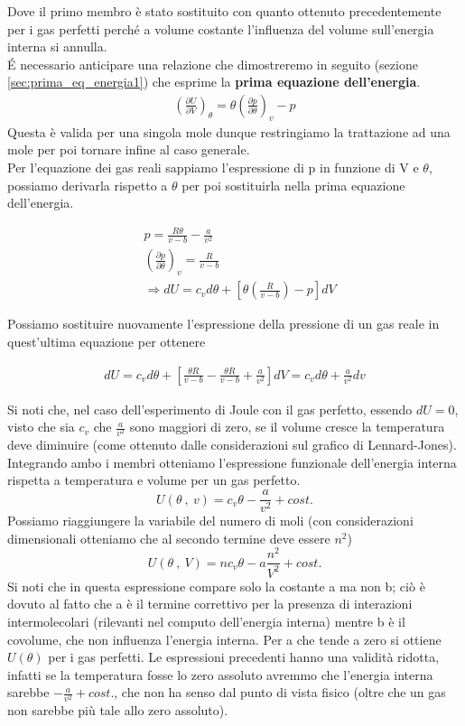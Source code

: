 \documentclass[
10pt, %
a4paper, %
oneside, %
headinclude,footinclude, %
BCOR5mm, %
]{scrartcl}
\begin{document}
Dove il primo membro è stato sostituito con quanto ottenuto precedentemente per i gas perfetti perché a volume costante l'influenza del volume sull'energia interna si annulla.\\
\'{E} necessario anticipare una relazione che dimostreremo in seguito (sezione \ref{sec:prima_eq_energia1}) che esprime la \textbf{prima equazione dell'energia}.
\begin{align}\label{eq:prima_eq_energia}
	\left(\frac{\partial U}{\partial V}\right)_{\theta} = \theta \left(\frac{\partial p}{\partial \theta}\right)_v - p 
\end{align}
Questa è valida per una singola mole dunque restringiamo la trattazione ad una mole per poi tornare infine al caso generale.\\
Per l'equazione dei gas reali sappiamo l'espressione di p in funzione di V e \(\theta\), possiamo derivarla rispetto a $\theta$ per poi sostituirla nella prima equazione dell'energia. 

\begin{align*} 
	&p = \frac{R\theta}{v-b}-\frac{a}{v^2}\\
	&\left(\frac{\partial p}{\partial \theta}\right)_v = \frac{R}{v-b}\\
	&\Rightarrow dU = c_v d\theta + \left[ \theta \left(\frac{R}{v-b}\right)-p \right]dV
\end{align*} 

Possiamo sostituire nuovamente l'espressione della pressione di un gas reale in quest'ultima equazione per ottenere

\begin{align*} 
	dU = c_v d\theta + \left[\frac{\theta R}{v-b}-\frac{\theta R}{v-b}+\frac{a}{v^2}\right] dV = c_v d\theta +\frac{a}{v^2}dv
\end{align*} 

Si noti che, nel caso dell'esperimento di Joule con il gas perfetto, essendo \(dU = 0\), visto che sia \(c_v\) che \(\frac{a}{v^2}\) sono maggiori di zero, se il volume cresce la temperatura deve diminuire (come ottenuto dalle considerazioni sul grafico di Lennard-Jones).\\
Integrando ambo i membri otteniamo l'espressione funzionale dell'energia interna rispetta a temperatura e volume per un gas perfetto. 
\[U(\theta\ ,\ v) = c_v\theta - \frac{a}{v^2}+ cost.\]
Possiamo riaggiungere la variabile del numero di moli (con considerazioni dimensionali otteniamo che al secondo termine deve essere \(n^2\))
\[U(\theta\ ,\ V) = n c_v\theta - a\frac{n^2}{V^2}+ cost.\]
Si noti che in questa espressione compare solo la costante a ma non b; ciò è dovuto al fatto che a è il termine correttivo per la presenza di interazioni intermolecolari (rilevanti nel computo dell'energia interna) mentre b è il covolume, che non influenza l'energia interna. Per a che tende a zero si ottiene\( U(\theta)\) per i gas perfetti. Le espressioni precedenti hanno una validità ridotta, infatti se la temperatura fosse lo zero assoluto avremmo che l'energia interna sarebbe \(-\frac{a}{v^2}+cost.\), che non ha senso dal punto di vista fisico (oltre che un gas non sarebbe più tale allo zero assoluto). 
\end{document}
